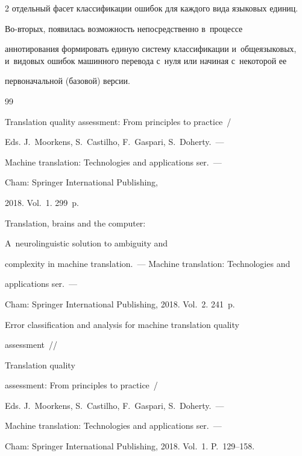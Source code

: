 \begin{multicols}{2}
отдельный фасет классификации ошибок для каждого вида языковых единиц. 


Во-вто\-рых, появилась возможность непосредственно в~процессе 


аннотирования формировать единую систему классификации и~общеязыковых, и~видовых ошибок машинного перевода с~нуля или начиная с~некоторой ее 


первоначальной (базовой) версии.


  


   {\small\frenchspacing


 {%




 \begin{thebibliography}{99}




Translation quality assessment: From principles to practice~/ 


Eds. J.~Moorkens, S.~Castilho, F.~Gaspari, S.~Doherty.~---


Machine translation: Technologies and applications ser.~--- 


Cham: Springer International Publishing, 


2018. Vol.~1. 299~p.




 Translation, brains and the computer: 


A~neurolinguistic solution to ambiguity and 


complexity in machine translation.~--- Machine translation: Technologies and 


applications ser.~--- 


Cham: Springer International Publishing, 2018. Vol.~2. 241~p.






Error classification and analysis for machine translation quality 


assessment~//


Translation quality 


assessment: From principles to practice~/ 


Eds. J.~Moorkens, S.~Castilho, F.~Gaspari, S.~Doherty.~---


Machine translation: Technologies and applications ser.~--- 


Cham: Springer International Publishing, 2018. Vol.~1. P.~129--158.



\end{thebibliography}}}
\end{multicols}
